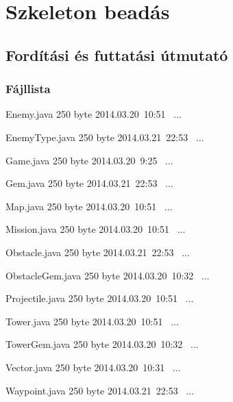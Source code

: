 %
\chapter{Szkeleton beadás}

\thispagestyle{fancy}

\section{Fordítási és futtatási útmutató}

\subsection{Fájllista}

\begin{fajllista}

\fajl
{Enemy.java} %
{250 byte} %
{2014.03.20~10:51~}
{...} %

\fajl
{EnemyType.java} %
{250 byte} %
{2014.03.21~22:53~}
{...} %

\fajl
{Game.java} %
{250 byte} %
{2014.03.20~9:25~}
{...} %

\fajl
{Gem.java} %
{250 byte} %
{2014.03.21~22:53~}
{...} %

\fajl
{Map.java} %
{250 byte} %
{2014.03.20~10:51~}
{...} %

\fajl
{Mission.java} %
{250 byte} %
{2014.03.20~10:51~}
{...} %

\fajl
{Obstacle.java} %
{250 byte} %
{2014.03.21~22:53~}
{...} %

\fajl
{ObstacleGem.java} %
{250 byte} %
{2014.03.20~10:32~}
{...} %

\fajl
{Projectile.java} %
{250 byte} %
{2014.03.20~10:51~}
{...} %

\fajl
{Tower.java} %
{250 byte} %
{2014.03.20~10:51~}
{...} %

\fajl
{TowerGem.java} %
{250 byte} %
{2014.03.20~10:32~}
{...} %

\fajl
{Vector.java} %
{250 byte} %
{2014.03.20~10:31~}
{...} %

\fajl
{Waypoint.java} %
{250 byte} %
{2014.03.21~22:53~}
{...} %

\end{fajllista}

